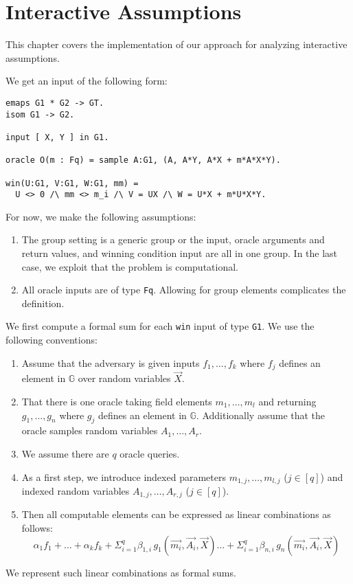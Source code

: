 \newcommand{\group}{\mathbb{G}}
\chapter{Interactive Assumptions}

This chapter covers the implementation of our approach for
analyzing interactive assumptions.

We get an input of the following form:
\begin{verbatim}
emaps G1 * G2 -> GT.
isom G1 -> G2.

input [ X, Y ] in G1.

oracle O(m : Fq) = sample A:G1, (A, A*Y, A*X + m*A*X*Y).

win(U:G1, V:G1, W:G1, mm) =
  U <> 0 /\ mm <> m_i /\ V = UX /\ W = U*X + m*U*X*Y.
\end{verbatim}

For now, we make the following assumptions:
\begin{enumerate}
\item The group setting is a generic group or the input, oracle
  arguments and return values, and winning condition input
  are all in one group. In the last case, we exploit that the
  problem is computational.
\item All oracle inputs are of type \verb!Fq!. Allowing for group
  elements complicates the definition.
\end{enumerate}

We first compute a formal sum for each \verb!win! input of type \verb!G1!.
We use the following conventions:
\begin{enumerate}
\item Assume that the adversary is given inputs
  $f_1, \ldots, f_k$ where $f_j$ defines an element in
  $\group$ over random variables $\vec{X}$.
\item That there is one oracle taking field elements
  $m_1,\ldots,m_l$ and returning $g_1,\ldots,g_n$
  where $g_j$ defines an element in $\group$.
  Additionally assume that the oracle samples
  random variables $A_1,\ldots,A_r$.
\item We assume there are $q$ oracle queries.
\item As a first step, we introduce indexed parameters
  $m_{1,j},\ldots,m_{l,j}$ ($j \in [q]$) and
  indexed random variables
  $A_{1,j},\ldots,A_{r,j}$ ($j \in [q]$).  
\item Then all computable elements can
  be expressed as linear combinations as follows:
  \[
    \alpha_1 f_1 + \ldots + \alpha_k f_k
    + \Sigma_{i=1}^q \beta_{1,i}\, g_1(\vec{m_i},\vec{A_i},\vec{X})
    \ldots
    + \Sigma_{i=1}^q \beta_{n,i}\, g_n(\vec{m_i},\vec{A_i},\vec{X})
  \]
\end{enumerate}

We represent such linear combinations as formal sums.